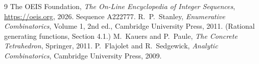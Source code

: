 \documentclass[11pt,a4paper]{article}
\theoremstyle{plain}
\theoremstyle{definition}
\begin{document}
\begin{thebibliography}{9}
 The OEIS Foundation, \emph{The On-Line Encyclopedia of Integer
Sequences}, \url{https://oeis.org}, 2026. Sequence A222777.
 R.~P.~Stanley, \emph{Enumerative Combinatorics}, Volume 1, 2nd ed.,
Cambridge University Press, 2011. (Rational generating functions, Section 4.1.)
 M.~Kauers and P.~Paule, \emph{The Concrete Tetrahedron}, Springer, 2011.
 P.~Flajolet and R.~Sedgewick, \emph{Analytic Combinatorics}, Cambridge
University Press, 2009.
\end{thebibliography}
\end{document}
